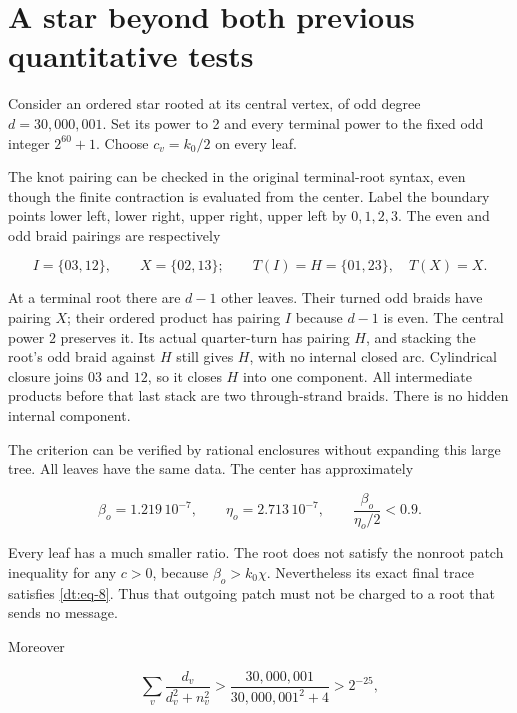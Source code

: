 \section{A star beyond both previous quantitative tests}\label{dt:sec-9}

Consider an ordered star rooted at its central vertex, of odd degree
\(d=30{,}000{,}001\). Set its power to 2 and every terminal power to the fixed
odd integer \(2^{60}+1\). Choose \(c_v=k_0/2\) on every leaf.

The knot pairing can be checked in the original terminal-root syntax,
even though the finite contraction is evaluated from the center. Label
the boundary points lower left, lower right, upper right, upper left
by \(0,1,2,3\). The even and odd braid pairings are respectively

\begin{equation}\label{dt:eq-54a}
I=\{03,12\},\qquad X=\{02,13\};\qquad
 T(I)=H=\{01,23\},\quad T(X)=X.
\end{equation}

At a terminal root there are \(d-1\) other leaves. Their turned odd
braids have pairing \(X\); their ordered product has pairing \(I\)
because \(d-1\) is even. The central power \(2\) preserves it. Its
actual quarter-turn has pairing \(H\), and stacking the root's odd
braid against \(H\) still gives \(H\), with no internal closed arc.
Cylindrical closure joins \(03\) and \(12\), so it closes \(H\)
into one component. All intermediate products before that last stack
are two through-strand braids. There is no hidden internal component.

The criterion can be verified by rational enclosures without expanding this large
tree. All leaves have the same data. The center has approximately

\begin{equation}\label{dt:eq-54}
\beta_o=1.219\,10^{-7},\qquad
 \eta_o=2.713\,10^{-7},\qquad
       \frac{\beta_o}{\eta_o/2}<0.9.
\end{equation}

Every leaf has a much smaller ratio. The root does not satisfy the
nonroot patch inequality for any \(c>0\), because \(\beta_o>k_0\chi\).
Nevertheless its exact final trace satisfies \eqref{dt:eq-8}. Thus that outgoing
patch must not be charged to a root that sends no message.

Moreover

\begin{equation}\label{dt:eq-55}
\sum_v\frac{d_v}{d_v^2+n_v^2}
       >\frac{30,000,001}{30,000,001^2+4}>2^{-25},
\end{equation}

